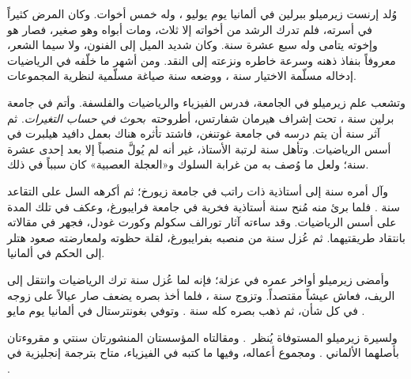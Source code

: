 \documentclass[../../../include/open-logic-section]{subfiles}
\begin{document}



وُلد إرنست زيرميلو ببرلين في ألمانيا يوم  يوليو ، وله خمس أخوات.
وكان المرض كثيراً في أسرته، فلم تدرك الرشد من أخواته إلا ثلاث، ومات أبواه
وهو صغير، فصار هو وإخوته يتامى وله سبع عشرة سنة. وكان شديد الميل إلى
الفنون، ولا سيما الشعر، معروفاً بنفاذ ذهنه وسرعة خاطره ونزعته إلى النقد.
ومن أشهر ما خلّفه في الرياضيات إدخاله مسلّمة الاختيار سنة ، ووضعه سنة
 صياغة مسلّمية لنظرية المجموعات.

وتشعب علم زيرميلو في الجامعة، فدرس الفيزياء والرياضيات والفلسفة. وأتم في
جامعة برلين سنة ، تحت إشراف هيرمان شفارتس، أطروحته~\emph{بحوث في
حساب التغيرات}. ثم آثر سنة  أن يتم درسه في جامعة غوتنغن، فاشتد تأثره
هناك بعمل دافيد هيلبرت في أسس الرياضيات. وتأهل سنة  لرتبة الأستاذ،
غير أنه لم يُولَّ منصباً إلا بعد إحدى عشرة سنة؛ ولعل ما وُصف به من غرابة
السلوك و«العجلة العصبية» كان سبباً في ذلك.

وآل أمره سنة  إلى أستاذية ذات راتب في جامعة زيورخ؛ ثم أكرهه السل على
التقاعد سنة . فلما برئ منه مُنح سنة  أستاذية فخرية في جامعة
فرايبورغ، وعكف في تلك المدة على أسس الرياضيات. وقد ساءته آثار تورالف سكولم
وكورت غودل، فجهر في مقالاته بانتقاد طريقتيهما. ثم عُزل سنة  من منصبه
بفرايبورغ، لقلة حظوته ولمعارضته صعود هتلر إلى الحكم في ألمانيا.

وأمضى زيرميلو أواخر عمره في عزلة؛ فإنه لما عُزل سنة  ترك الرياضيات
وانتقل إلى الريف، فعاش عيشاً مقتصداً. وتزوج سنة ، فلما أخذ بصره يضعف
صار عيالاً على زوجه في كل شأن، ثم ذهب بصره كله سنة . وتوفي بغونترستال
في ألمانيا يوم  مايو .

\begin{reading}
ولسيرة زيرميلو المستوفاة يُنظر~\citet{Ebbinghaus2015}. ومقالتاه المؤسستان
المنشورتان سنتي  و مقروءتان بأصلهما الألماني
\citep{Zermelo1904,Zermelo1908}. ومجموع أعماله، وفيها ما كتبه في
الفيزياء، متاح بترجمة إنجليزية في
\citep{Ebbinghaus2010,Ebbinghaus2013}.
\end{reading}
\end{document}
